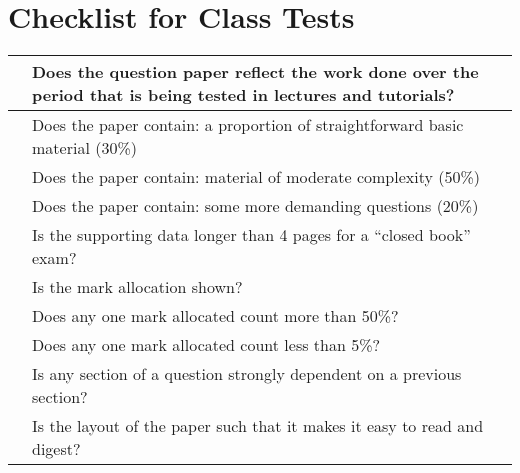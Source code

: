 \documentclass{ArcHandout}
\begin{document}
\section{Checklist for Class Tests}
\begin{tabular}{|p{5mm}|p{}|}\hline
  & Does the question paper reflect the work done over the period that
  is being tested in lectures and tutorials?\\\hline

  & Does the paper contain:
     a proportion of straightforward basic material (30\%)\\
  & Does the paper contain:
     material of moderate complexity (50\%)\\
  & Does the paper contain:
     some more demanding questions (20\%)\\\hline

  & Is the supporting data longer than 4 pages for a ``closed book''
  exam?\\\hline

  & Is the mark allocation shown?\\\hline

  & Does any one mark allocated count more than 50\%?\\\hline

  & Does any one mark allocated count less than 5\%?\\\hline

  & Is any section of a question strongly dependent on a previous
  section?\\\hline

  & Is the layout of the paper such that it makes it easy to read and
  digest?\\\hline
\end{tabular}
\end{document}
